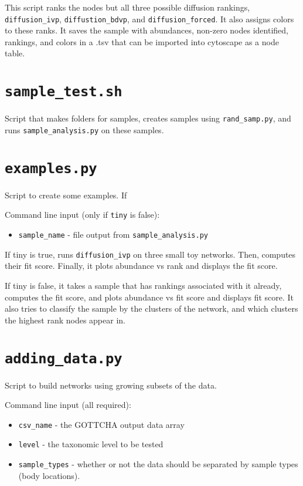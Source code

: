 \documentclass[10pt]{article}
\theoremstyle{definition}
\numberwithin{theorem}{section}
\numberwithin{definition}{section}
\numberwithin{lemma}{section}
\numberwithin{corollary}{section}
\numberwithin{clm}{section}
\numberwithin{rmk}{section}
\begin{document}
This script ranks the nodes but all three possible diffusion rankings, \verb|diffusion_ivp|, \verb|diffustion_bdvp|, and \verb|diffusion_forced|. It also assigns colors to these ranks. It saves the sample with abundances, non-zero nodes identified, rankings, and colors in a .tsv that can be imported into cytoscape as a node table. 

\cprotect \section{\verb|sample_test.sh|}

Script that makes folders for samples, creates samples using \verb|rand_samp.py|, and runs \verb|sample_analysis.py| on these samples.

\cprotect \section{\verb|examples.py|}

Script to create some examples. If 

Command line input (only if \verb|tiny| is false):
\begin{itemize}
	\item \verb|sample_name| - file output from \verb|sample_analysis.py|
\end{itemize}

If tiny is true, runs \verb|diffusion_ivp| on three small toy networks. Then, computes their fit score. Finally, it plots abundance vs rank and displays the fit score.

If tiny is false, it takes a sample that has rankings associated with it already, computes the fit score, and plots abundance vs fit score and displays fit score. It also tries to classify the sample by the clusters of the network, and which clusters the highest rank nodes appear in.

\cprotect \section{\verb|adding_data.py|}

Script to build networks using growing subsets of the data. 

Command line input (all required):
\begin{itemize}
	\item \verb|csv_name| - the GOTTCHA output data array
	\item \verb|level| - the taxonomic level to be tested
	\item \verb|sample_types| - whether or not the data should be separated by sample types (body locations).
\end{itemize}
\end{document}
